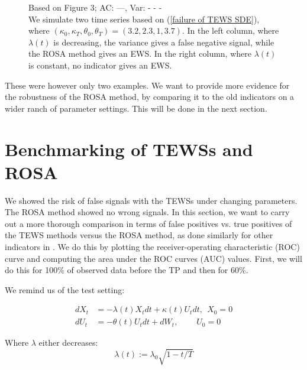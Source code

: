 \documentclass[%
thesis=student,%
coverpage=false,%
titlepage=false,%
headmarks=true, %
english,%
font=libertine, %
math=newpxtx, %
BCOR=5mm,%
coverBCOR=11mm%
]{tumbook}
\begin{document}
\begin{figure}
\begin{minipage}{0.49\textwidth}
    \end{minipage}
    \begin{minipage}{\textwidth}
    \centering
    \caption{Based on \cite{Morr:2024} Figure 3; AC: ---, Var: - - - \\
    We simulate two time series based on (\ref{failure of TEWS SDE}), where $(\kappa_{0},\kappa_{T},\theta_{0},\theta_{T}) = (3.2,2.3,1,3.7)$. In the left column, where $\lambda(t)$ is decreasing, the variance gives a false negative signal, while the ROSA method gives an EWS. In the right column, where $\lambda(t)$ is constant, no indicator gives an EWS. 
    }
    \label{false negative example}
    \end{minipage}    
\end{figure}


These were however only two examples. We want to provide more evidence for the robustness of the ROSA method, by comparing it to the old indicators on a wider ranch of parameter settings. This will be done in the next section.
    


\chapter{Benchmarking of TEWSs and ROSA}

We showed the risk of false signals with the TEWSs under changing parameters. The ROSA method showed no wrong signals.
In this section, we want to carry out a more thorough comparison in terms of false positives vs. true positives of the TEWS methods versus the ROSA method, as done similarly for other indicators in \cite{Morr:2024}. We do this by plotting the receiver-operating characteristic (ROC) curve and computing the area under the ROC curves (AUC) values. First, we will do this for 100\% of observed data before the TP and then for 60\%.

We remind us of the test setting: 

\begin{subequations}
    \begin{align*}
        dX_{t} &= -\lambda(t) X_{t}dt + \kappa(t) U_{t}dt, \ \ X_{0} = 0 \\
        dU_{t} &= -\theta(t) U_{t}dt + dW_{t}, \ \ \ \ \ \ \ \ \ \ U_{0} = 0
    \end{align*}
\end{subequations}

Where $\lambda$ either decreases: 
    \[
    \lambda(t) := \lambda_{0}\sqrt{1-t/T}
    \]
\end{document}
